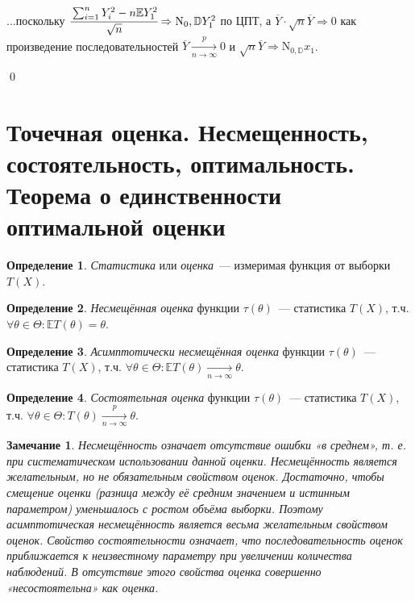 \documentclass[oneside,final,14pt]{extreport}
\renewenvironment{proof}{{\bfseries Доказательство.}}{\qed}
\newtheorem*{rmrk}{Замечание}
\theoremstyle{definition}
\newtheorem{defn}{Определение}[section]
\begin{document}
\begin{proof}
\begin{enumerate}
    ...поскольку \( \cfrac{\sum_{i=1}^{n} Y_{i}^{2}-n \mathbb{E} Y_{1}^{2}}{\sqrt{n}} \Rightarrow \mathrm{N}_{0}, \mathbb{D} Y_{1}^{2} \) по ЦПТ, а \( \overline{Y} \cdot \sqrt{n} \overline{Y} \Rightarrow 0 \) как произведение последовательностей \( \overline{Y} \xrightarrow[n \rightarrow \infty]{p} 0 \) и \(\sqrt{n} \overline{Y} \Rightarrow \mathrm{N}_{0, \mathbb{D}} x_{1} \).
\end{enumerate}
\end{proof}

\section{Точечная оценка. Несмещенность, состоятельность, оптимальность. Теорема о единственности оптимальной оценки}
\begin{defn}
{\it Статистика} или {\it оценка}~--- измеримая функция от выборки \( T(X) \).
\end{defn}

\begin{defn}
{\it Несмещённая оценка}  функции \( \tau(\theta) \)~--- статистика \( T(X) \), т.ч. \( \forall \theta \in \Theta: \mathbb{E}T(\theta) = \theta \).
\end{defn}

\begin{defn}
{\it Асимптотически несмещённая оценка}  функции \( \tau(\theta) \)~--- статистика \( T(X) \), т.ч. \( \forall \theta \in \Theta: \mathbb{E}T(\theta) \xrightarrow[n \rightarrow \infty]{} \theta \).
\end{defn}

\begin{defn}
{\it Состоятельная оценка}  функции \( \tau(\theta) \)~--- статистика \( T(X) \), т.ч. \( \forall \theta \in \Theta: T(\theta) \xrightarrow[n \rightarrow \infty]{p} \theta \).
\end{defn}

\begin{rmrk}
Несмещённость означает отсутствие ошибки «в среднем», т. е. при систематическом использовании данной оценки. Несмещённость является желательным, но не обязательным свойством оценок. Достаточно, чтобы смещение оценки (разница между её средним значением и истинным параметром) уменьшалось с ростом объёма выборки. Поэтому асимптотическая несмещённость является весьма желательным свойством оценок. Свойство состоятельности означает, что последовательность оценок приближается к неизвестному параметру при увеличении количества наблюдений. В отсутствие этого свойства оценка совершенно «несостоятельна» как оценка.
\end{rmrk}
\end{document}
